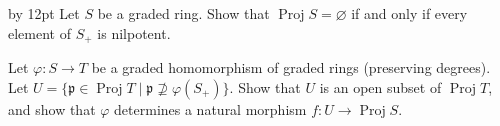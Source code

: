 {{\vspace{2pt}
{\advance\leftskip by 12pt
\noindent\hypertarget{ex-II-2.14}{}\hypertarget{ex-II-2.14a}{}Let $S$ be a graded ring. Show that $\operatorname{Proj}S=\varnothing$ if and only if every element of $S_+$ is nilpotent.

\noindent\hypertarget{ex-II-2.14b}{}Let $\varphi\colon S\to T$ be a graded homomorphism of graded rings (preserving degrees). Let $U=\{\mathfrak p\in\operatorname{Proj}T\mid\mathfrak p\nsupseteq\varphi(S_+)\}$. Show that $U$ is an open subset of $\operatorname{Proj}T$, and show that $\varphi$ determines a natural morphism $f\colon U\to\operatorname{Proj}S$.\par}\par}
}
